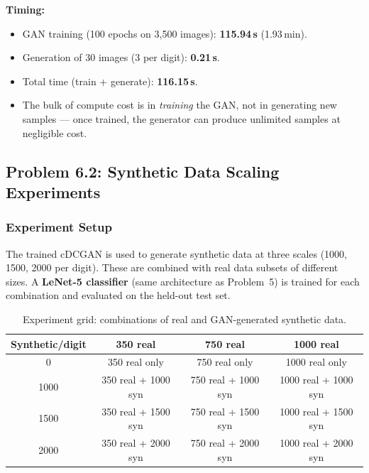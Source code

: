 \documentclass[12pt, a4paper]{article}
\renewcommand{\arraystretch}{1.12}
\begin{document}
\textbf{Timing:}
\begin{itemize}
    \item GAN training (100 epochs on 3{,}500 images): \textbf{115.94\,s} (1.93\,min).
    \item Generation of 30 images (3 per digit): \textbf{0.21\,s}.
    \item Total time (train + generate): \textbf{116.15\,s}.
    \item The bulk of compute cost is in \emph{training} the GAN, not in generating new
          samples --- once trained, the generator can produce unlimited samples at
          negligible cost.
\end{itemize}

\subsection{Problem 6.2: Synthetic Data Scaling Experiments}

\subsubsection{Experiment Setup}

The trained cDCGAN is used to generate synthetic data at three scales (1000, 1500,
2000 per digit). These are combined with real data subsets of different sizes. A
\textbf{LeNet-5 classifier} (same architecture as Problem~5) is trained for each
combination and evaluated on the held-out test set.

\begin{table}[H]
\centering
\renewcommand{\arraystretch}{1.3}
\begin{tabular}{c | c c c}
\toprule
\textbf{Synthetic/digit} & \textbf{350 real} & \textbf{750 real} & \textbf{1000 real} \\
\midrule
0    & 350 real only & 750 real only & 1000 real only \\
1000 & 350 real + 1000 syn & 750 real + 1000 syn & 1000 real + 1000 syn \\
1500 & 350 real + 1500 syn & 750 real + 1500 syn & 1000 real + 1500 syn \\
2000 & 350 real + 2000 syn & 750 real + 2000 syn & 1000 real + 2000 syn \\
\bottomrule
\end{tabular}
\caption{Experiment grid: combinations of real and GAN-generated synthetic data.}
\label{tab:prob6_experiment_grid}
\end{table}
\end{document}
